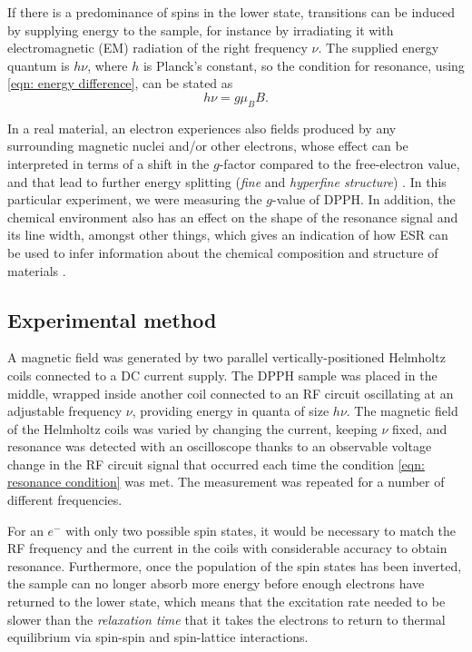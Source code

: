 \documentclass[a4paper]{jpconf}
\numberwithin{equation}{section}
\begin{document}
If there is a predominance of spins in the lower state, transitions can be induced by supplying energy to the sample, for instance by irradiating it with electromagnetic (EM) radiation of the right frequency $\nu$. The supplied energy quantum is $h \nu$, where $h$ is Planck's constant, so the condition for resonance, using \eqref{eqn: energy difference}, can be stated as
\begin{equation}
	h\nu = g\mu_B B. \label{eqn: resonance condition}
\end{equation}

In a real material, an electron experiences also fields produced by any surrounding magnetic nuclei and/or other electrons, whose effect can be interpreted in terms of a shift in the $g$-factor compared to the free-electron value, and that lead to further energy splitting (\emph{fine} and \emph{hyperfine structure}) \cite{Lancaster}. In this particular experiment, we were measuring the $g$-value of DPPH. In addition, the chemical environment also has an effect on the shape of the resonance signal and its line width, amongst other things, which gives an indication of how ESR can be used to infer information about the chemical composition and structure of materials \cite{Lancaster}. 

\subsection{Experimental method}\label{section: method}
A magnetic field was generated by two parallel vertically-positioned Helmholtz coils connected to a DC current supply. The DPPH sample was placed in the middle, wrapped inside another coil connected to an RF circuit oscillating at an adjustable frequency $\nu$, providing energy in quanta of size $h\nu$. The magnetic field of the Helmholtz coils was varied by changing the current, keeping $\nu$ fixed, and resonance was detected with an oscilloscope thanks to an observable voltage change in the RF circuit signal that occurred each time the condition \eqref{eqn: resonance condition} was met. The measurement was repeated for a number of different frequencies.  

For an $e^-$ with only two possible spin states, it would be necessary to match the RF frequency and the current in the coils with considerable accuracy to obtain resonance. Furthermore, once the population of the spin states has been inverted, the sample can no longer absorb more energy before enough electrons have returned to the lower state, which means that the excitation rate needed to be slower than the \emph{relaxation time} that it takes the electrons to return to thermal equilibrium via spin-spin and spin-lattice interactions. 
\end{document}

